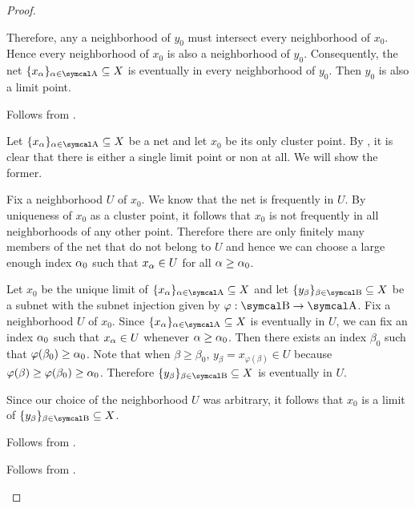 \begin{proof}
\begin{description}
    Therefore, any a neighborhood of \( y_0 \) must intersect every neighborhood of \( x_0 \). Hence every neighborhood of \( x_0 \) is also a neighborhood of \( y_0 \). Consequently, the net \( \{ x_\al \}_{\al \in \CA} \subseteq X \) is eventually in every neighborhood of \( y_0 \). Then \( y_0 \) is also a limit point.

    \mbox{}
    \begin{description}
      \Implies Follows from .

      \ImpliedBy Let \( \{ x_\al \}_{\al \in \CA} \subseteq X \) be a net and let \( x_0 \) be its only cluster point. By , it is clear that there is either a single limit point or non at all. We will show the former.

      Fix a neighborhood \( U \) of \( x_0 \). We know that the net is frequently in \( U \). By uniqueness of \( x_0 \) as a cluster point, it follows that \( x_0 \) is not frequently in all neighborhoods of any other point. Therefore there are only finitely many members of the net that do not belong to \( U \) and hence we can choose a large enough index \( \alpha_0 \) such that \( x_\alpha \in U \) for all \( \alpha \geq \alpha_0 \).
    \end{description}

    \mbox{}
    \begin{description}
      \Implies Let \( x_0 \) be the unique limit of \( \{ x_\al \}_{\al \in \CA} \subseteq X \) and let \( \{ y_\beta \}_{\beta \in \CB} \subseteq X \) be a subnet with the subnet injection given by \( \varphi: \CB \to \CA \). Fix a neighborhood \( U \) of \( x_0 \). Since \( \{ x_\al \}_{\al \in \CA} \subseteq X \) is eventually in \( U \), we can fix an index \( \alpha_0 \) such that \( x_\alpha \in U \) whenever \( \alpha \geq \alpha_0 \). Then there exists an index \( \beta_0 \) such that \( \varphi(\beta_0) \geq \alpha_0 \). Note that when \( \beta \geq \beta_0 \), \( y_\beta = x_{\varphi(\beta)} \in U \) because \( \varphi(\beta) \geq \varphi(\beta_0) \geq \alpha_0 \). Therefore \( \{ y_\beta \}_{\beta \in \CB} \subseteq X \) is eventually in \( U \).

      Since our choice of the neighborhood \( U \) was arbitrary, it follows that \( x_0 \) is a limit of \( \{ y_\beta \}_{\beta \in \CB} \subseteq X \).

      \ImpliedBy Follows from .
    \end{description}


    Follows from .
  \end{description}
\end{proof}

